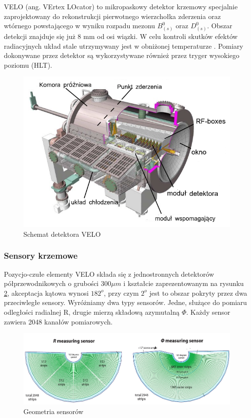 VELO (ang. VErtex LOcator) to mikropaskowy detektor krzemowy specjalnie zaprojektowany do rekonstrukcji pierwotnego wierzchołka zderzenia oraz wtórnego powstającego w wyniku rozpadu mezonu $B_{(s)}^0$ oraz $D_{(s)}^0$\cite{VELORaport}. Obszar detekcji znajduje się już 8 mm od osi wiązki. W celu kontroli skutków efektów radiacyjnych układ stale utrzymywany jest w obniżonej temperaturze \cite{Papadelis} . Pomiary dokonywane przez detektor są wykorzystywane również przez tryger wysokiego poziomu (HLT). 
\begin{figure}[!ht]
 \centering
 \includegraphics[scale=0.7]{rozdzial2/Velo_jakis.png}
 \caption{Schemat detektora VELO\cite{VELORaport}}
 \label{fig:SchematVELO}
\end{figure}
\subsubsection{Sensory krzemowe }
Pozycjo-czułe elementy VELO składa się z jednostronnych detektorów półprzewodnikowych o grubości 300$\mu m$ i  kształcie zaprezentowanym na rysunku \ref{fig:sensory}, akceptacja kątowa wynosi $182^{o}$, przy czym $2^{o}$ jest to obszar pokryty przez dwa przeciwległe sensory. Wyróżniamy dwa typy sensorów. Jedne, służące do pomiaru odległości radialnej R, drugie mierzą składową azymutalną $\Phi$. Każdy sensor zawiera 2048 kanałów pomiarowych. 
\begin{figure}[ht!]
 \centering
 \includegraphics[scale=0.4]{rozdzial2/sensory.jpeg}
 \caption{Geometria sensorów \cite{VELORaport}}
 \label{fig:sensory}
\end{figure}

